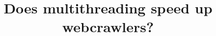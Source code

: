 \documentclass{sig-alternate-05-2015}
\begin{document}






%

\title{Does multithreading speed up webcrawlers?}
%
%
%
%
%
\end{document}

